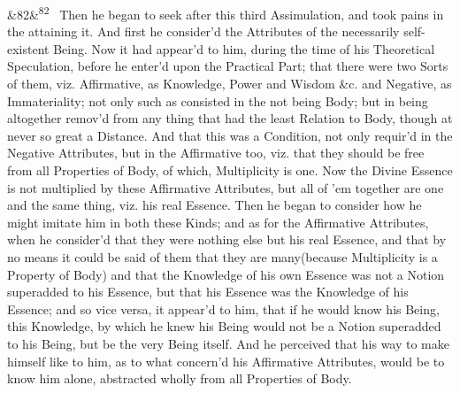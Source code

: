 \documentclass[12pt]{article}
\newcommand{\para}[1][]{\par\noindent\ifx&#1&\else\textsuperscript{\footnotesize #1}~\fi}
\begin{document}
\para[82] Then he began to seek after this third Assimulation, and took pains in the attaining it. And first he consider'd the Attributes of the necessarily self-existent Being. Now it had appear'd to him, during the time of his Theoretical Speculation, before he enter'd upon the Practical Part; that there were two Sorts of them, viz. Affirmative, as Knowledge, Power and Wisdom \&c. and Negative, as Immateriality; not only such as consisted in the not being Body; but in being altogether remov'd from any thing that had the least Relation to Body, though at never so great a Distance. And that this was a Condition, not only requir'd in the Negative Attributes, but in the Affirmative too, viz. that they should be free from all Properties of Body, of which, Multiplicity is one. Now the Divine Essence is not multiplied by these Affirmative Attributes, but all of 'em together are one and the same thing, viz. his real Essence. Then he began to consider how he might imitate him in both these Kinds; and as for the Affirmative Attributes, when he consider'd that they were nothing else but his real Essence, and that by no means it could be said of them that they are many(because Multiplicity is a Property of Body) and that the Knowledge of his own Essence was not a Notion superadded to his Essence, but that his Essence was the Knowledge of his Essence; and so vice versa, it appear'd to him, that if he would know his Being, this Knowledge, by which he knew his Being would not be a Notion superadded to his Being, but be the very Being itself. And he perceived that his way to make himself like to him, as to what concern'd his Affirmative Attributes, would be to know him alone, abstracted wholly from all Properties of Body.
\end{document}
